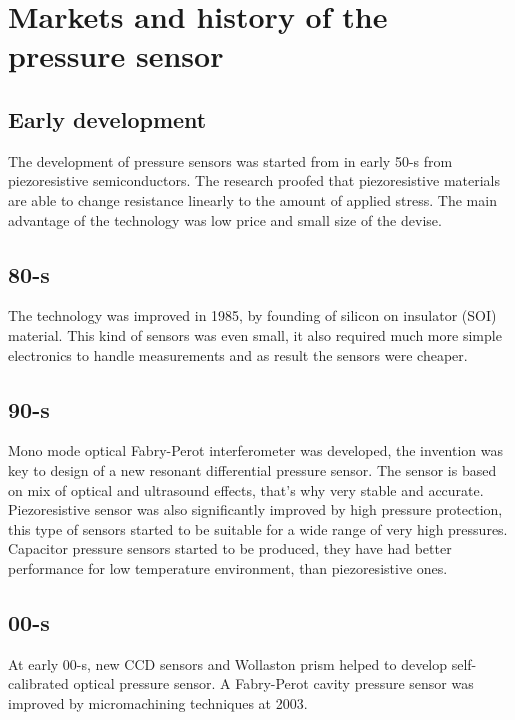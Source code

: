 \documentclass[english]{article}
\begin{document}
\section{Markets and history of the pressure sensor}

\subsection{Early development}

The development of pressure sensors was started from in early 50-s from piezoresistive semiconductors. The research proofed that piezoresistive materials are able to change resistance linearly to the amount of applied stress. The main advantage of the technology was low price and small size of the devise.\\

\subsection{80-s}

The technology was improved in 1985, by founding of silicon on insulator (SOI) material. This kind of sensors was even small, it also required much more simple electronics to handle measurements and as result the sensors were cheaper.\\

\subsection{90-s}

Mono mode optical Fabry-Perot interferometer was developed, the invention was key to design of a new resonant differential pressure sensor. The sensor is based on mix of optical and ultrasound effects, that's why very stable and accurate.\\

Piezoresistive sensor was also significantly improved by high pressure protection, this type of sensors started to be suitable for a wide range of very high pressures. Capacitor pressure sensors started to be produced, they have had better performance for low temperature environment, than piezoresistive ones.

\subsection{00-s}

At early 00-s, new CCD sensors and Wollaston prism helped to develop self-calibrated optical pressure sensor. A Fabry-Perot cavity pressure sensor was improved by micromachining techniques at 2003. \\
\end{document}
